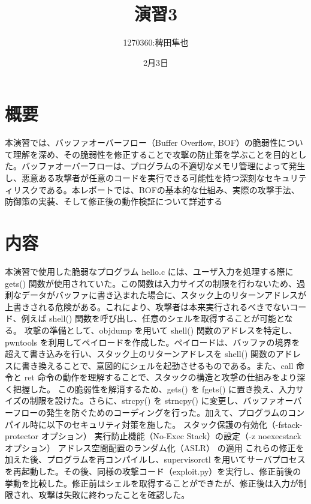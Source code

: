 \documentclass{jlreq}
\title{演習3}
\author{1270360:稗田隼也}
\date{2月3日}
\begin{document}
\maketitle
\section{概要}
本演習では、バッファオーバーフロー（Buffer Overflow, BOF）の脆弱性について理解を深め、その脆弱性を修正することで攻撃の防止策を学ぶことを目的とした。バッファオーバーフローは、プログラムの不適切なメモリ管理によって発生し、悪意ある攻撃者が任意のコードを実行できる可能性を持つ深刻なセキュリティリスクである。本レポートでは、BOFの基本的な仕組み、実際の攻撃手法、防御策の実装、そして修正後の動作検証について詳述する
\section{内容}
本演習で使用した脆弱なプログラム hello.c には、ユーザ入力を処理する際に gets() 関数が使用されていた。この関数は入力サイズの制限を行わないため、過剰なデータがバッファに書き込まれた場合に、スタック上のリターンアドレスが上書きされる危険がある。これにより、攻撃者は本来実行されるべきでないコード、例えば shell() 関数を呼び出し、任意のシェルを取得することが可能となる。
攻撃の準備として、objdump を用いて shell() 関数のアドレスを特定し、pwntools を利用してペイロードを作成した。ペイロードは、バッファの境界を超えて書き込みを行い、スタック上のリターンアドレスを shell() 関数のアドレスに書き換えることで、意図的にシェルを起動させるものである。また、call 命令と ret 命令の動作を理解することで、スタックの構造と攻撃の仕組みをより深く把握した。
この脆弱性を解消するため、gets() を fgets() に置き換え、入力サイズの制限を設けた。さらに、strcpy() を strncpy() に変更し、バッファオーバーフローの発生を防ぐためのコーディングを行った。加えて、プログラムのコンパイル時に以下のセキュリティ対策を施した。
スタック保護の有効化（-fstack-protector オプション）
実行防止機能（No-Exec Stack）の設定（-z noexecstack オプション）
アドレス空間配置のランダム化（ASLR） の適用
これらの修正を加えた後、プログラムを再コンパイルし、supervisorctl を用いてサーバプロセスを再起動した。その後、同様の攻撃コード（exploit.py）を実行し、修正前後の挙動を比較した。修正前はシェルを取得することができたが、修正後は入力が制限され、攻撃は失敗に終わったことを確認した。
\end{document}
